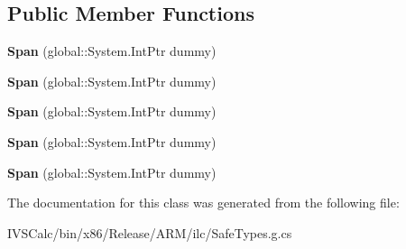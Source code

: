 \subsection*{Public Member Functions}
\begin{DoxyCompactItemize}
\item 
\mbox{\label{class_windows_1_1_u_i_1_1_xaml_1_1_documents_1_1_span_a5e2657b8b7948f0dbd3ee2ead04f5a2f}} 
{\bfseries Span} (global\+::\+System.\+Int\+Ptr dummy)
\item 
\mbox{\label{class_windows_1_1_u_i_1_1_xaml_1_1_documents_1_1_span_a5e2657b8b7948f0dbd3ee2ead04f5a2f}} 
{\bfseries Span} (global\+::\+System.\+Int\+Ptr dummy)
\item 
\mbox{\label{class_windows_1_1_u_i_1_1_xaml_1_1_documents_1_1_span_a5e2657b8b7948f0dbd3ee2ead04f5a2f}} 
{\bfseries Span} (global\+::\+System.\+Int\+Ptr dummy)
\item 
\mbox{\label{class_windows_1_1_u_i_1_1_xaml_1_1_documents_1_1_span_a5e2657b8b7948f0dbd3ee2ead04f5a2f}} 
{\bfseries Span} (global\+::\+System.\+Int\+Ptr dummy)
\item 
\mbox{\label{class_windows_1_1_u_i_1_1_xaml_1_1_documents_1_1_span_a5e2657b8b7948f0dbd3ee2ead04f5a2f}} 
{\bfseries Span} (global\+::\+System.\+Int\+Ptr dummy)
\end{DoxyCompactItemize}


The documentation for this class was generated from the following file\+:\begin{DoxyCompactItemize}
\item 
I\+V\+S\+Calc/bin/x86/\+Release/\+A\+R\+M/ilc/Safe\+Types.\+g.\+cs\end{DoxyCompactItemize}
